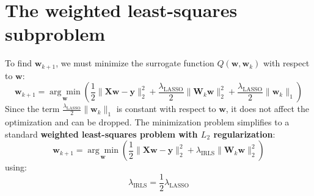 \section{The weighted least-squares subproblem}
\label{sec:irls_subproblem}

To find $\mathbf{w}_{k+1}$, we must minimize the surrogate function $Q(\mathbf{w}, \mathbf{w}_k)$ with respect to $\mathbf{w}$:
$$\mathbf{w}_{k+1} = \underset{\mathbf{w}}{\arg\min} \left( \frac{1}{2}\|\mathbf{Xw} - \mathbf{y}\|_2^2 + \frac{\lambda_{\text{LASSO}}}{2}\|\mathbf{W}_k\mathbf{w}\|_2^2 + \frac{\lambda_{\text{LASSO}}}{2}\|\mathbf{w}_k\|_1 \right)$$
Since the term $\frac{\lambda_{\text{LASSO}}}{2}\|\mathbf{w}_k\|_1$ is constant with respect to $\mathbf{w}$, it does not affect the optimization and can be dropped. The minimization problem simplifies to a standard \textbf{weighted least-squares problem with $L_2$ regularization}:
\begin{equation}
    \mathbf{w}_{k+1} = \underset{\mathbf{w}}{\arg\min} \left( \frac{1}{2}\|\mathbf{Xw} - \mathbf{y}\|_2^2 + \lambda_{\text{IRLS}} \|\mathbf{W}_k \mathbf{w}\|^2_2 \right)
    \label{eq:irls_subproblem}
\end{equation}
using:
\begin{equation}
    \lambda_{\text{IRLS}} = \frac{1}{2}\lambda_{\text{LASSO}}
    \label{eq:lambda_relation}
\end{equation}


